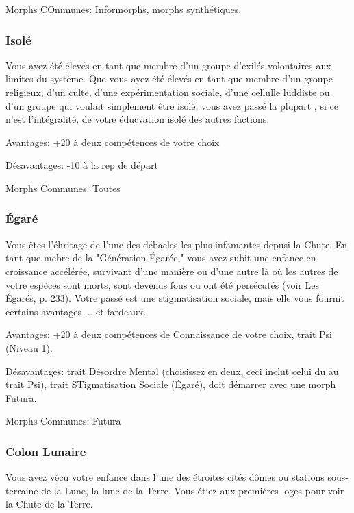 Morphs COmmunes: Informorphs, morphs synthétiques. 

\subsubsection{Isolé} \label{sec:isolite} 

Vous avez été élevés en tant que membre d'un groupe d'exilés volontaires aux limites du système. Que vous ayez été élevés en tant que membre d'un groupe religieux, d'un culte, d'une expérimentation sociale, d'une cellulle luddiste ou d'un groupe qui voulait simplement être isolé, vous avez passé la plupart , si ce n'est l'intégralité, de votre éducvation isolé des autres factions. 

Avantages: +20 à deux compétences de votre choix 

Désavantages: -10 à la rep de départ 

Morphs Communes: Toutes 

\subsubsection{Égaré} \label{sec:lost} 

Vous êtes l'éhritage de l'une des débacles les plus infamantes depusi la Chute. En tant que mebre de la "Génération Égarée," vous avez subit une enfance en croissance accélérée, survivant d'une manière ou d'une autre là où les autres de votre espèces sont morts, sont devenus fous ou ont été persécutés (voir Les Égarés, p. 233). Votre passé est une stigmatisation sociale, mais elle vous fournit certains avantages ... et fardeaux. 

Avantages: +20 à deux compétences de Connaissance de votre choix, trait Psi (Niveau 1). 

Désavantages: trait Désordre Mental (choisissez en deux, ceci inclut celui du au trait Psi), trait STigmatisation Sociale (Égaré), doit démarrer avec une morph Futura. 

Morphs Communes: Futura 

\subsubsection{Colon Lunaire} \label{sec:lunar-colonist} 

Vous avez vécu votre enfance dans l'une des étroites cités dômes ou stations sous-terraine de la Lune, la lune de la Terre. Vous étiez aux premières loges pour voir la Chute de la Terre. 

